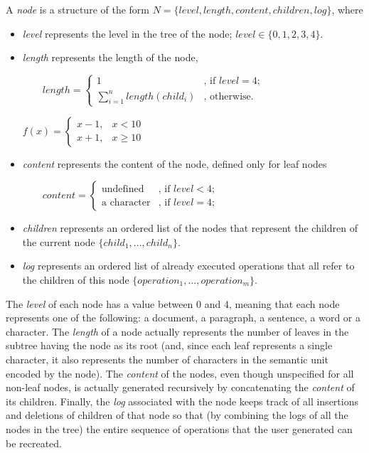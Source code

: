 \begin{defi}
A \emph{node} is a structure of the form $N=\{level,length,content,children,log\}$, where

\begin{itemize}

\item \emph{level} represents the level in the tree of the node; $level \in \{0,1,2,3,4\}$.

\item \emph{length} represents the length of the node,

$\qquad length=\left\{
\begin{array}{ll}
1 & \text {, if }level=4; \\ 
\sum\limits_{i=1}^{n}length(child_{i}) & \text{, otherwise.}
\end{array}
\right.$

$f(x)=\left\{
\begin{array}{ll}
x-1, & x < 10 \\
x+1, & x \ge 10
\end{array}
\right.$

\item \emph{content} represents the content of the node, defined only for leaf nodes

$\qquad content=\left\{
\begin{array}{ll}
\text{undefined} & \text{, if }level<4; \\
\text{a character} & \text{, if }level=4;
\end{array}
\right.$

\item \emph{children} represents an ordered list of the nodes that represent the children
      of the current node $\{child_{1},\dots,child_{n}\}$.

\item \emph{log} represents an ordered list of already executed operations that all refer
      to the children of this node $\{operation_{1},\dots,operation_{m}\}$.

\end{itemize}
\end{defi}

The \emph{level} of each node has a value between 0 and 4, meaning that each node represents
one of the following: a document, a paragraph, a sentence, a word or a character. The
\emph{length} of a node actually represents the number of leaves in the subtree having
the node as its root (and, since each leaf represents a single character, it also represents
the number of characters in the semantic unit encoded by the node). The \emph{content} of the nodes,
even though unspecified for all non-leaf nodes, is actually generated recursively by concatenating
the \emph{content} of its children. Finally, the
\emph{log} associated with the node keeps track of all insertions and deletions of
children of that node so that (by combining the logs of all the nodes in the tree) the
entire sequence of operations that the user generated can be recreated.

